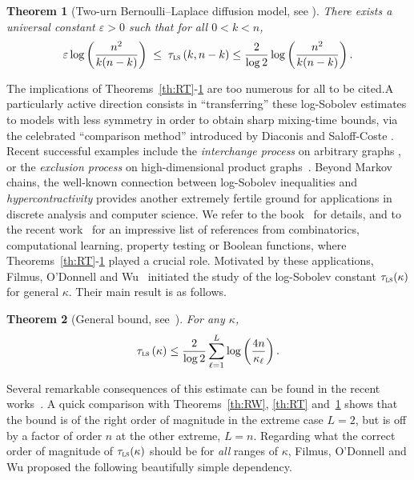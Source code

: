 \documentclass[10pt]{amsart}
\newtheorem{theo}{Theorem}[section]
\theoremstyle{definition}\newtheorem{defi}[theo]{Definition}\newtheorem{rema}[theo]{Remark}\newtheorem{exam}[theo]{Example}\newtheorem{exem}[theo]{Example}\newtheorem{nota}[theo]{Notation}
\newcommand{\tls}{\tau_{\textsc{ls}}}
\begin{document}
\begin{theo}[{Two-urn Bernoulli--Laplace diffusion model, see \cite[Theorem~5]{MR1675008}}]\label{th:BL}
There exists a universal constant $\varepsilon>0$ such that for all $0< k< n$,
\[
\varepsilon \log \left(\frac{n^2}{k(n-k)}\right)\; \le \; \tls\left(k,n-k\right) \le \frac{2}{\log 2} \log \left(\frac{n^2}{k(n-k)}\right).
\]

\end{theo}

The implications of Theorems~\ref{th:RT}-\ref{th:BL} are too numerous for all to be cited.\linebreak A particularly active direction consists in ``transferring'' these log-Sobolev estimates to models with less symmetry in order to obtain sharp mixing-time bounds, via the celebrated ``comparison method'' introduced by Diaconis and Saloff-Coste \cite{MR1245303,MR1233621}. Recent successful examples include the \emph{interchange process} on arbitrary graphs \cite{2018arXiv181110537A}, or the \emph{exclusion process} on high-dimensional product graphs~\cite{2019arXiv190502146H}. Beyond Markov chains, the well-known connection between log-Sobolev inequalities and \emph{hypercontractivity} provides another extremely fertile ground for applications in discrete analysis and computer science. We refer to the book~\cite[Chapters~9 \&~10]{MR3443800} for details, and to the recent work~\cite{2018arXiv180903546F} for an impressive list of references from combinatorics, computational learning, property testing or Boolean functions, where Theorems~\ref{th:RT}-\ref{th:BL} played a crucial role. Motivated by these applications, {Filmus}, {O'Donnell} and {Wu}~\cite{2018arXiv180903546F} initiated the study of the log-Sobolev constant $\tls(\kappa)$ for general $\kappa$. Their main result is as follows.

\begin{theo}[{General bound, see~\cite[Theorem~1]{2018arXiv180903546F}}]\label{th:F}
For any $\kappa$,
\[
\tls\left(\kappa\right) \le \frac{2}{\log 2} \sum_{\ell=1}^L \log \left(\frac{4n}{\kappa_\ell}\right).
\]
\end{theo}

Several remarkable consequences of this estimate can be found in the recent works~\cite{2018arXiv180903546F,MR4079633}. A quick comparison with Theorems~\ref{th:RW}, \ref{th:RT} and~\ref{th:BL} shows that the bound is of the right order of magnitude in the extreme case $L=2$, but is off by a factor of order $n$ at the other extreme, $L=n$. Regarding what the correct order of magnitude of $\tls(\kappa)$ should be for \emph{all} ranges of $\kappa$, {Filmus}, {O'Donnell} and {Wu} proposed the following beautifully simple dependency.
\end{document}
